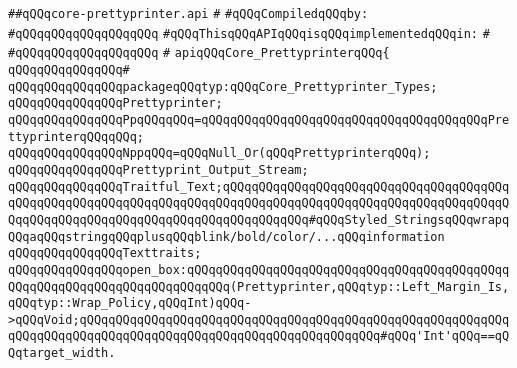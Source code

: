 \label{src/lib/prettyprint/big/src/core-prettyprinter.api}
\verb|##qQQqcore-prettyprinter.api|\newline
\verb|#|\newline
\newline
\verb|#qQQqCompiledqQQqby:|\newline
\verb|#qQQqqQQqqQQqqQQqqQQq|\newline
\newline
\verb|#qQQqThisqQQqAPIqQQqisqQQqimplementedqQQqin:|\newline
\verb|#|\newline
\verb|#qQQqqQQqqQQqqQQqqQQq|\newline
\verb|#|\newline
\verb|apiqQQqCore_PrettyprinterqQQq{|\newline
\verb|qQQqqQQqqQQqqQQq#|\newline
\verb|qQQqqQQqqQQqqQQqpackageqQQqtyp:qQQqCore_Prettyprinter_Types;|\newline
\newline
\verb|qQQqqQQqqQQqqQQqPrettyprinter;|\newline
\verb|qQQqqQQqqQQqqQQqPpqQQqqQQq=qQQqqQQqqQQqqQQqqQQqqQQqqQQqqQQqqQQqqQQqPrettyprinterqQQqqQQq;|\newline
\verb|qQQqqQQqqQQqqQQqNppqQQq=qQQqNull_Or(qQQqPrettyprinterqQQq);|\newline
\newline
\verb|qQQqqQQqqQQqqQQqPrettyprint_Output_Stream;|\newline
\newline
\verb|qQQqqQQqqQQqqQQqTraitful_Text;qQQqqQQqqQQqqQQqqQQqqQQqqQQqqQQqqQQqqQQqqQQqqQQqqQQqqQQqqQQqqQQqqQQqqQQqqQQqqQQqqQQqqQQqqQQqqQQqqQQqqQQqqQQqqQQqqQQqqQQqqQQqqQQqqQQqqQQqqQQqqQQqqQQqqQQq#qQQqStyled_StringsqQQqwrapqQQqaqQQqstringqQQqplusqQQqblink/bold/color/...qQQqinformation|\newline
\newline
\verb|qQQqqQQqqQQqqQQqTexttraits;|\newline
\newline
\verb|qQQqqQQqqQQqqQQqopen_box:qQQqqQQqqQQqqQQqqQQqqQQqqQQqqQQqqQQqqQQqqQQqqQQqqQQqqQQqqQQqqQQqqQQqqQQqqQQq(Prettyprinter,qQQqtyp::Left_Margin_Is,qQQqtyp::Wrap_Policy,qQQqInt)qQQq->qQQqVoid;qQQqqQQqqQQqqQQqqQQqqQQqqQQqqQQqqQQqqQQqqQQqqQQqqQQqqQQqqQQqqQQqqQQqqQQqqQQqqQQqqQQqqQQqqQQqqQQqqQQqqQQqqQQqqQQq#qQQq'Int'qQQq==qQQqtarget_width.|\newline

